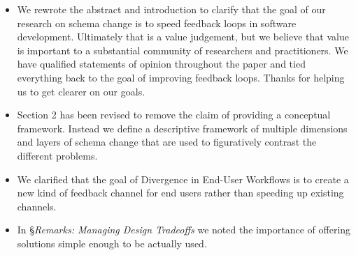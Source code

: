 \documentclass{article}
\begin{document}
\begin{itemize}
  \item We rewrote the abstract and introduction to clarify that the goal of our research on schema change is to speed feedback loops in software development. Ultimately that is a value judgement, but we believe that value is important to a substantial community of researchers and practitioners. We have qualified statements of opinion throughout the paper and tied everything back to the goal of improving feedback loops. Thanks for helping us to get clearer on our goals.

  \item Section 2 has been revised to remove the claim of providing a conceptual framework. Instead we define a descriptive framework of multiple dimensions and layers of schema change that are used to figuratively contrast the different problems.



\item We clarified that the goal of Divergence in End-User Workflows is to create a new kind of feedback channel for end users rather than speeding up existing channels.

\item In \S\emph{Remarks: Managing Design Tradeoffs} we noted the importance of offering solutions simple enough to be actually used.
\end{itemize}
\end{document}
